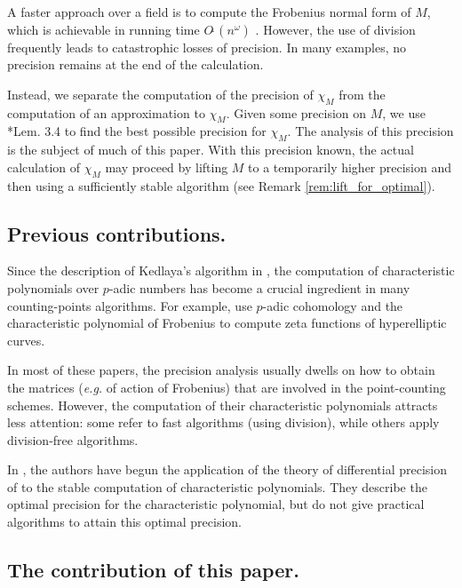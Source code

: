\documentclass{sig-alternate-05-2015}
\newcommand{\softO}{O\tilde{~}}
\begin{document}
A faster approach over a field is to compute the Frobenius normal form of $M$,
which is achievable in running time $\softO(n^\omega)$ .
However, the use of division frequently leads to catastrophic losses of precision.
In many examples, no precision remains at the end of the calculation.

Instead, we separate the computation of the precision of $\chi_M$ from the computation
of an approximation to $\chi_M$.  Given some precision on $M$, we use \cite{caruso-roe-vaccon:14a}*{Lem. 3.4}
to find the best possible precision for $\chi_M$.  The analysis of this precision is the subject
of much of this paper.  With this precision known, the actual calculation of $\chi_M$
may proceed by lifting $M$ to a temporarily higher precision and then using a sufficiently
stable algorithm (see Remark \ref{rem:lift_for_optimal}).

\subsection*{Previous contributions.}

Since the description of Kedlaya's algorithm in
\cite{kedlaya:01a}, the computation of characteristic polynomials
over $p$-adic numbers
has become a crucial ingredient in many counting-points algorithms.
For example, \cite{harvey:07a, harvey:14a} use $p$-adic cohomology
and the characteristic polynomial of Frobenius to compute zeta functions
of hyperelliptic curves.

In most of these papers, the precision analysis usually
dwells on how to obtain the matrices (\textit{e.g.} of action of Frobenius)
that are involved in the point-counting schemes.
However, the computation of their characteristic polynomials 
attracts less attention: some
refer to fast algorithms (using division), while others
apply division-free algorithms.

In \cite{caruso-roe-vaccon:15a}, the authors have begun the application
of the theory of differential precision of \cite{caruso-roe-vaccon:14a}
to the stable computation of characteristic polynomials.
They describe the optimal precision
for the characteristic polynomial, but do not give practical algorithms
to attain this optimal precision.

\subsection*{The contribution of this paper.}
\end{document}

